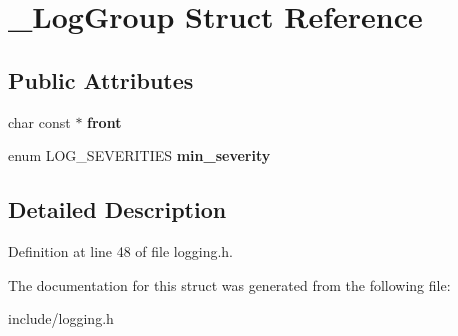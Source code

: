 \hypertarget{struct__LogGroup}{\section{\-\_\-\-Log\-Group Struct Reference}
\label{struct__LogGroup}
}
\subsection*{Public Attributes}
\begin{DoxyCompactItemize}
\item 
\hypertarget{struct__LogGroup_a249a516d2e658850d9679acabd230757}{char const $\ast$ {\bfseries front}}\label{struct__LogGroup_a249a516d2e658850d9679acabd230757}

\item 
\hypertarget{struct__LogGroup_a3f555f56df0a10dcaaa3f977f3ed589a}{enum L\-O\-G\-\_\-\-S\-E\-V\-E\-R\-I\-T\-I\-E\-S {\bfseries min\-\_\-severity}}\label{struct__LogGroup_a3f555f56df0a10dcaaa3f977f3ed589a}

\end{DoxyCompactItemize}


\subsection{Detailed Description}


Definition at line 48 of file logging.\-h.



The documentation for this struct was generated from the following file\-:\begin{DoxyCompactItemize}
\item 
include/logging.\-h\end{DoxyCompactItemize}
